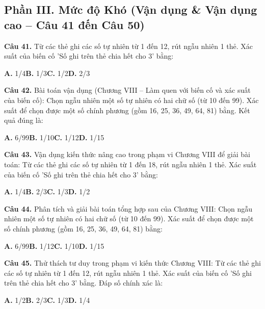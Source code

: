 \documentclass[11pt,a4paper]{article}
\begin{document}
\subsection*{\color{accent} Phần III. Mức độ Khó (Vận dụng \& Vận dụng cao -- Câu 41 đến Câu 50)}
\textbf{\color{primary} Câu 41.} Từ các thẻ ghi các số tự nhiên từ 1 đến 12, rút ngẫu nhiên 1 thẻ. Xác suất của biến cố 'Số ghi trên thẻ chia hết cho 3' bằng:\par
\hspace*{1.5em}\textbf{A.} 1/4\quad\quad \textbf{B.} 1/3\quad\quad \textbf{C.} 1/2\quad\quad \textbf{D.} 2/3\par\vspace{2pt}
\textbf{\color{primary} Câu 42.} Bài toán vận dụng (Chương VIII – Làm quen với biến cố và xác suất của biến cố): Chọn ngẫu nhiên một số tự nhiên có hai chữ số (từ 10 đến 99). Xác suất để chọn được một số chính phương (gồm 16, 25, 36, 49, 64, 81) bằng. Kết quả đúng là:\par
\hspace*{1.5em}\textbf{A.} 6/99\quad\quad \textbf{B.} 1/10\quad\quad \textbf{C.} 1/12\quad\quad \textbf{D.} 1/15\par\vspace{2pt}
\textbf{\color{primary} Câu 43.} Vận dụng kiến thức nâng cao trong phạm vi Chương VIII để giải bài toán: Từ các thẻ ghi các số tự nhiên từ 1 đến 18, rút ngẫu nhiên 1 thẻ. Xác suất của biến cố 'Số ghi trên thẻ chia hết cho 3' bằng:\par
\hspace*{1.5em}\textbf{A.} 1/4\quad\quad \textbf{B.} 2/3\quad\quad \textbf{C.} 1/3\quad\quad \textbf{D.} 1/2\par\vspace{2pt}
\textbf{\color{primary} Câu 44.} Phân tích và giải bài toán tổng hợp sau của Chương VIII: Chọn ngẫu nhiên một số tự nhiên có hai chữ số (từ 10 đến 99). Xác suất để chọn được một số chính phương (gồm 16, 25, 36, 49, 64, 81) bằng:\par
\hspace*{1.5em}\textbf{A.} 6/99\quad\quad \textbf{B.} 1/12\quad\quad \textbf{C.} 1/10\quad\quad \textbf{D.} 1/15\par\vspace{2pt}
\textbf{\color{primary} Câu 45.} Thử thách tư duy trong phạm vi kiến thức Chương VIII: Từ các thẻ ghi các số tự nhiên từ 1 đến 12, rút ngẫu nhiên 1 thẻ. Xác suất của biến cố 'Số ghi trên thẻ chia hết cho 3' bằng. Đáp số chính xác là:\par
\hspace*{1.5em}\textbf{A.} 1/2\quad\quad \textbf{B.} 2/3\quad\quad \textbf{C.} 1/3\quad\quad \textbf{D.} 1/4\par\vspace{2pt}
\end{document}
